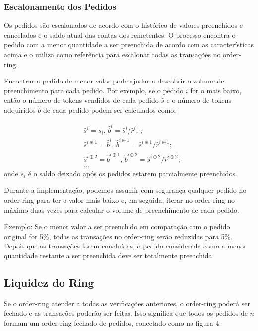 \documentclass[UTF8,nofonts]{article}
\begin{document}
\begin{multicols}{2}
\subsubsection{Escalonamento dos Pedidos\label{sec:order_scaling}}
Os pedidos são escalonados de acordo com o histórico de valores preenchidos e cancelados e o saldo atual das contas dos remetentes. O processo encontra o pedido com a menor quantidade a ser preenchida de acordo com as características acima e o utiliza como referência para escalonar todas as transações no order-ring.


Encontrar a pedido de menor valor pode ajudar a descobrir o volume de preenchimento para cada pedido. Por exemplo, se o pedido $i$ for o mais baixo, então o número de tokens vendidos de cada pedido $\hat{s}$ e o número de tokens adquiridos $\hat{b}$ de cada pedido podem ser calculados como:

\[
\begin{split}
&\hat{s}^{i}=\overline{s}_i\text{, } \hat{b}^{i}=\hat{s}^{i}/ \hat{r}^i\text{, }\text{;}\\
&\hat{s}^{i\oplus 1}=\hat{b}^i\text{, } \hat{b}^{i\oplus 1}=\hat{s}^{i\oplus 1}/ \hat{r}^{i\oplus 1}\text{;}\\
&\hat{s}^{i\oplus 2}=\hat{b}^{i\oplus 1}\text{, } \hat{b}^{i\oplus 2}=\hat{s}^{i\oplus 2}/ \hat{r}^{i\oplus 2}\text{;}\\
& ...
\end{split}
\]
onde $\overline{s}_i$ é o saldo deixado após os pedidos estarem parcialmente preenchidos.

Durante a implementação, podemos assumir com segurança qualquer pedido no order-ring para ter o valor mais baixo e, em seguida, iterar no order-ring no máximo duas vezes para calcular o volume de preenchimento de cada pedido. 

Exemplo: Se o menor valor a ser preenchido em comparação com o pedido original for 5\%, todas as transações no order-ring  serão reduzidas para 5\%. Depois que as transações forem concluídas, o pedido considerada como a menor quantidade restante a ser preenchida deve ser totalmente preenchida.

\subsection{Liquidez do Ring\label{sec:settlement}}

Se o order-ring atender a todas as verificações anteriores, o order-ring poderá ser fechado e as transações poderão ser feitas. Isso significa que todos os pedidos de $n$ formam um order-ring fechado de pedidos, conectado como na figura 4:


\end{multicols}
\end{document}
